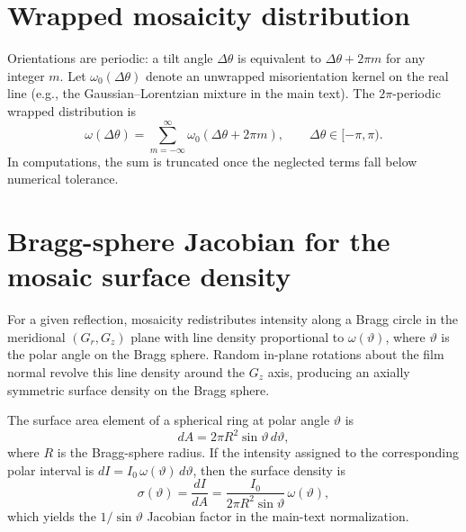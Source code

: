 \documentclass[12pt]{article}
\begin{document}
\section{Wrapped mosaicity distribution}
\label{sec:si_wrapped_distribution}

Orientations are periodic: a tilt angle $\Delta\theta$ is equivalent to $\Delta\theta+2\pi m$ for any
integer $m$. Let $\omega_0(\Delta\theta)$ denote an unwrapped misorientation kernel on the real line
(e.g., the Gaussian--Lorentzian mixture in the main text). The $2\pi$-periodic wrapped distribution is
\begin{equation}
  \omega(\Delta\theta)=\sum_{m=-\infty}^{\infty}\omega_0(\Delta\theta+2\pi m),
  \qquad \Delta\theta\in[-\pi,\pi).
  \label{eq:si_wrapped_definition}
\end{equation}
In computations, the sum is truncated once the neglected terms fall below numerical tolerance.

\section{Bragg-sphere Jacobian for the mosaic surface density}
\label{sec:si_bragg_sphere_jacobian}

For a given reflection, mosaicity redistributes intensity along a Bragg circle in the meridional
$(G_r,G_z)$ plane with line density proportional to $\omega(\vartheta)$, where $\vartheta$ is the
polar angle on the Bragg sphere. Random in-plane rotations about the film normal revolve this line
density around the $G_z$ axis, producing an axially symmetric surface density on the Bragg sphere.

The surface area element of a spherical ring at polar angle $\vartheta$ is
\begin{equation}
  dA = 2\pi R^2 \sin\vartheta\, d\vartheta,
  \label{eq:si_area_element}
\end{equation}
where $R$ is the Bragg-sphere radius. If the intensity assigned to the corresponding polar interval
is $dI = I_0\,\omega(\vartheta)\,d\vartheta$, then the surface density is
\begin{equation}
  \sigma(\vartheta)=\frac{dI}{dA}=\frac{I_0}{2\pi R^2\sin\vartheta}\,\omega(\vartheta),
  \label{eq:si_sigma_jacobian}
\end{equation}
which yields the $1/\sin\vartheta$ Jacobian factor in the main-text normalization.
\end{document}
